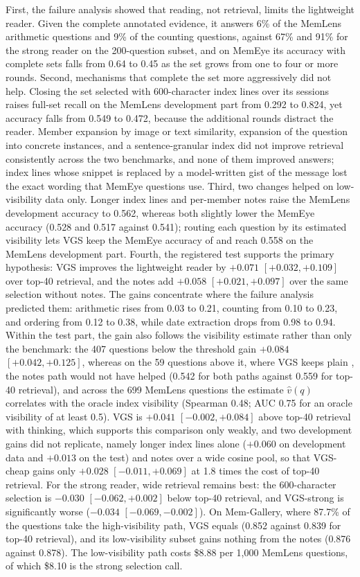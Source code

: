 First, the failure analysis showed that reading, not retrieval, limits the lightweight reader. Given the complete annotated evidence, it answers 6\% of the MemLens arithmetic questions and 9\% of the counting questions, against 67\% and 91\% for the strong reader on the 200-question subset, and on MemEye its accuracy with complete \qss{} sets falls from 0.64 to 0.45 as the set grows from one to four or more rounds. Second, mechanisms that complete the set more aggressively did not help. Closing the set selected with 600-character index lines over its sessions raises full-set recall on the MemLens development part from 0.292 to 0.824, yet accuracy falls from 0.549 to 0.472, because the additional rounds distract the reader. Member expansion by image or text similarity, expansion of the question into concrete instances, and a sentence-granular index did not improve retrieval consistently across the two benchmarks, and none of them improved answers; index lines whose snippet is replaced by a model-written gist of the message lost the exact wording that MemEye questions use. Third, two changes helped on low-visibility data only. Longer index lines and per-member notes raise the MemLens development accuracy to 0.562, whereas both slightly lower the MemEye accuracy (0.528 and 0.517 against 0.541); routing each question by its estimated visibility lets VGS keep the MemEye accuracy of \qss{} and reach 0.558 on the MemLens development part. Fourth, the registered test supports the primary hypothesis: VGS improves the lightweight reader by $+0.071$ $[+0.032, +0.109]$ over top-40 retrieval, and the notes add $+0.058$ $[+0.021, +0.097]$ over the same selection without notes. The gains concentrate where the failure analysis predicted them: arithmetic rises from 0.03 to 0.21, counting from 0.10 to 0.23, and ordering from 0.12 to 0.38, while date extraction drops from 0.98 to 0.94. Within the test part, the gain also follows the visibility estimate rather than only the benchmark: the 407 questions below the threshold gain $+0.084$ $[+0.042, +0.125]$, whereas on the 59 questions above it, where VGS keeps plain \qss{}, the notes path would not have helped (0.542 for both paths against 0.559 for top-40 retrieval), and across the 699 MemLens questions the estimate $\hat{v}(q)$ correlates with the oracle index visibility (Spearman 0.48; AUC 0.75 for an oracle visibility of at least 0.5). VGS is $+0.041$ $[-0.002, +0.084]$ above top-40 retrieval with thinking, which supports this comparison only weakly, and two development gains did not replicate, namely longer index lines alone ($+0.060$ on development data and $+0.013$ on the test) and notes over a wide cosine pool, so that VGS-cheap gains only $+0.028$ $[-0.011, +0.069]$ at 1.8 times the cost of top-40 retrieval. For the strong reader, wide retrieval remains best: the 600-character selection is $-0.030$ $[-0.062, +0.002]$ below top-40 retrieval, and VGS-strong is significantly worse ($-0.034$ $[-0.069, -0.002]$). On Mem-Gallery, where 87.7\% of the questions take the high-visibility path, VGS equals \qss{} (0.852 against 0.839 for top-40 retrieval), and its low-visibility subset gains nothing from the notes (0.876 against 0.878). The low-visibility path costs \$8.88 per 1,000 MemLens questions, of which \$8.10 is the strong selection call. 
